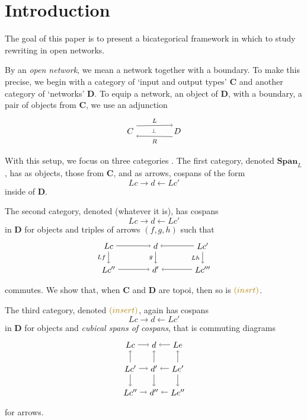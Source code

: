 \documentclass[]{amsart}
\newcommand{\cat}[1]{\mathbf{#1}}
\newcommand{\Span}{\mathbf{Span}}
\newcommand{\edit}[1]{\textcolor{editcolour}{(#1)}}
\theoremstyle{remark}
\theoremstyle{definition}
\begin{document}
 

\section{Introduction} \label{sec:introduction} 

The goal of this paper is to present a bicategorical framework in
which to study rewriting in open networks.

By an \emph{open network},
we mean a network together with a boundary.
To make this precise, we
begin with a category of `input and output types' 
$\cat{C}$ 
and another category of `networks' 
$ \cat{D} $.
To equip a network, an object of $\cat{D}$,
with a boundary, a pair of objects from $\cat{C}$,
we use an adjunction
\[ %
\begin{tikzpicture} 
\node (C) at (0,0) {$ C $};
\node (D) at (2,0) {$ D $};
\node at (1,0) {\scriptsize $ \perp $};
\draw [->] (C.40) to 
node [above] {\scriptsize $ L $} (D.130);
\draw [<-] (C.-40) to 
node [below] {\scriptsize $ R $} (D.-130);
\end{tikzpicture}
\]
With this setup, we focus on three categories
.
The first category, denoted 
$ \Span_L $,
has as objects, those from $ \cat{C} $,
and as arrows, cospans of the form
\[
Lc \to d \gets Lc'
\]
inside of $ \cat{D} $. 

The second category, denoted
\edit{whatever it is},
has cospans
\[
Lc \to d \gets Lc'
\]
in $ \cat{ D } $ for objects and
triples of arrows $ ( f , g , h ) $
such that 
\[  %
\begin{tikzpicture}
\node (Lc) at (-2,1) {$ Lc $};
\node (d) at (0,1) {$ d $};
\node (Lc') at (2,1) {$ Lc' $};
\node (Lc'') at (-2,0) {$ Lc'' $};
\node (d') at (0,0) {$ d' $};
\node (Lc''') at (2,0) {$ Lc''' $};
\draw [->] (Lc) to (d);
\draw [->] (Lc') to (d);
\draw [->] (Lc'') to (d');
\draw [->] (Lc''') to (d');
\draw [->] (Lc) to node [left] {\scriptsize $ Lf $ } (Lc'');
\draw [->] (d) to node [left] { \scriptsize $ g $ }(d');
\draw [->] (Lc') to node [left] { \scriptsize $ Lh $ }(Lc''');
\end{tikzpicture}
\]
commutes.
We show that, when $ \cat{C} $ and
$ \cat{D} $ are topoi, then so is $ \edit{insrt} $.

The third category, denoted
$ \edit{insert} $,
again has cospans 
\[
Lc \to d \gets Lc'
\]
in $ \cat{D} $ for objects and
\emph{cubical spans of cospans}, that is
commuting diagrams 
\[ %
\begin{tikzpicture}
\node (Lc) at (-1,1) {$ Lc $};
\node (Lc') at (-1,0) {$ Lc' $};
\node (Lc'') at (-1,-1) {$ Lc'' $};
\node (d) at (0,1) {$ d $};
\node (d') at (0,0) {$ d' $};
\node (d'') at (0,-1) {$ d'' $};
\node (Le) at (1,1) {$ Le $};
\node (Le') at (1,0) {$ Le' $};
\node (Le'') at (1,-1) {$ Le'' $};
\draw [->] (Lc) to (d);
\draw [->] (Le) to (d);
\draw [->] (Lc') to (d');
\draw [->] (Le') to (d');
\draw [->] (Lc'') to (d'');
\draw [->] (Le'') to (d'');
\draw [->] (Lc') to (Lc);
\draw [->] (Lc') to (Lc'');
\draw [->] (d') to (d);
\draw [->] (d') to (d'');
\draw [->] (Le') to (Le);
\draw [->] (Le') to (Le'');
\end{tikzpicture}
\]
for arrows.  
\end{document}
